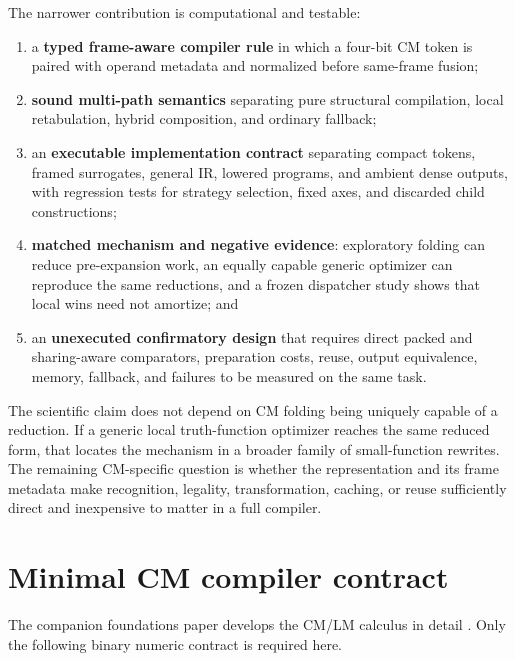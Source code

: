 \documentclass[10pt]{article}
\theoremstyle{plain}
\theoremstyle{definition}
\theoremstyle{remark}
\begin{document}
The narrower contribution is computational and testable:
\begin{enumerate}
  \item a \textbf{typed frame-aware compiler rule} in which a four-bit CM token is paired with operand metadata and normalized before same-frame fusion;
  \item \textbf{sound multi-path semantics} separating pure structural compilation, local retabulation, hybrid composition, and ordinary fallback;
  \item an \textbf{executable implementation contract} separating compact tokens, framed surrogates, general IR, lowered programs, and ambient dense outputs, with regression tests for strategy selection, fixed axes, and discarded child constructions;
  \item \textbf{matched mechanism and negative evidence}: exploratory folding can reduce pre-expansion work, an equally capable generic optimizer can reproduce the same reductions, and a frozen dispatcher study shows that local wins need not amortize; and
  \item an \textbf{unexecuted confirmatory design} that requires direct packed and sharing-aware comparators, preparation costs, reuse, output equivalence, memory, fallback, and failures to be measured on the same task.
\end{enumerate}

The scientific claim does not depend on CM folding being uniquely capable of a reduction. If a generic local truth-function optimizer reaches the same reduced form, that locates the mechanism in a broader family of small-function rewrites. The remaining CM-specific question is whether the representation and its frame metadata make recognition, legality, transformation, caching, or reuse sufficiently direct and inexpensive to matter in a full compiler.

\section{Minimal CM compiler contract}
\label{sec:minimal-contract}

The companion foundations paper develops the CM/LM calculus in detail \cite{TheoryFoundations2026}. Only the following binary numeric contract is required here.
\end{document}
